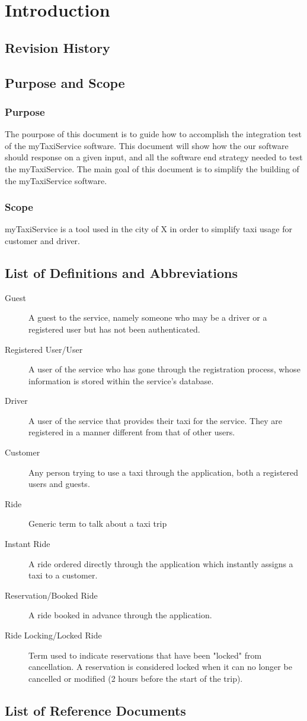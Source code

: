 \section{Introduction}
  \subsection{Revision History}
  \subsection{Purpose and Scope}
    \subsubsection{Purpose}
      The pourpose of this document is to guide how to accomplish the integration test of the myTaxiService software.
      This document will show how the our software should response on a given input, and all the software end strategy needed to test the myTaxiService.
      The main goal of this document is to simplify the building of the myTaxiService software.
    \subsubsection{Scope}
      myTaxiService is a tool used in the city of X in order to simplify taxi usage for customer and driver.
  \subsection{List of Definitions and Abbreviations}
    \begin{description}
    	\item[Guest]
    		A guest to the service, namely someone who may be a driver or a registered user but has not been authenticated.
    	\item[Registered User/User]
    		A user of the service who has gone through the registration process, whose information is stored within the service's database.
    	\item[Driver]
    		A user of the service that provides their taxi for the service. They are registered in a manner different from that of other users.
    	\item[Customer]
    		Any person trying to use a taxi through the application, both a registered users and guests.
    	\item[Ride]
    		Generic term to talk about a taxi trip
    	\item[Instant Ride]
    		A ride ordered directly through the application which instantly assigns a taxi to a customer.
    	\item[Reservation/Booked Ride]
    		A ride booked in advance through the application.
    	\item[Ride Locking/Locked Ride]
    		Term used to indicate reservations that have been "locked" from cancellation. A reservation is considered locked when it can no
    		longer be cancelled or modified (2 hours before the start of the trip).
    \end{description}
  \subsection{List of Reference Documents}
